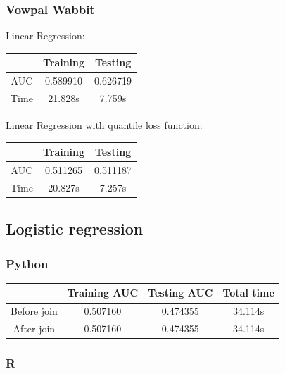 \documentclass[10pt]{article}
\begin{document}
\subsubsection{Vowpal Wabbit}

Linear Regression:\\

\begin{center}
 \begin{tabular}{|c | c | c||} 
 \hline
 & Training & Testing\\ [0.5ex] 
 \hline\hline
AUC & 0.589910 & 0.626719\\ 
 \hline
Time & 21.828s & 7.759s\\ 
 \hline
\end{tabular}
\end{center}

Linear Regression with quantile loss function:\\

\begin{center}
 \begin{tabular}{|c | c | c||} 
 \hline
 & Training & Testing\\ [0.5ex] 
 \hline\hline
AUC & 0.511265 & 0.511187\\ 
 \hline
Time & 20.827s & 7.257s\\ 
 \hline
\end{tabular}
\end{center}

\subsection{Logistic regression}
\subsubsection{Python}

\begin{center}
 \begin{tabular}{|c | c | c | c||} 
 \hline
 & Training AUC & Testing AUC & Total time\\ [0.5ex]
 \hline\hline
Before join & 0.507160 & 0.474355 & 34.114s\\
 \hline
After join & 0.507160 & 0.474355 & 34.114s\\ 
 \hline
\end{tabular}
\end{center}

\subsubsection{R}
\end{document}
